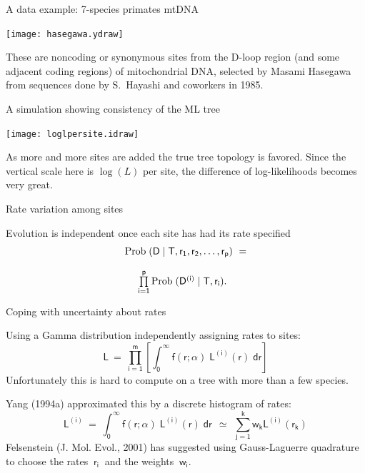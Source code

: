 \documentclass[bluish,slideColor,colorBG,pdf]{prosper}
\def\Prob{{\rm Prob\;}}
\begin{document}
\begin{slide}[Replace]{A data example: 7-species primates mtDNA}
\medskip

\centerline{\texttt{[image: hasegawa.ydraw]}}
\bigskip

These are noncoding or synonymous sites from the D-loop region (and some
adjacent coding regions) of mitochondrial DNA, selected by Masami Hasegawa from
sequences done by S.\ Hayashi and coworkers in 1985.


\end{slide}

\begin{slide}[Replace]{A simulation showing consistency of the ML tree}
\bigskip

\centerline{\texttt{[image: loglpersite.idraw]}}
\medskip

As more and more sites are added the true tree topology is favored.  Since
the vertical scale here is $\log(L)$ per site, the difference of log-likelihoods
becomes very great.

\end{slide}

\begin{slide}[Replace]{Rate variation among sites}
\medskip

Evolution is independent once each site has had its rate specified
\[
\begin{array}{l}
\mathsf{\Prob(D\; |\; T, r_1, r_2, \dots, r_p)\ = }\\
\\
\mathsf{~~~~\prod\limits_{i=1}^p \Prob(D^{(i)}\; |\; T, r_i)}.
\end{array}
\]

\end{slide}

\begin{slide}[Replace]{Coping with uncertainty about rates}
\medskip

Using a Gamma distribution independently assigning rates to sites:
\[
\mathsf{L\ =\ \prod_{i=1}^m \left[ \int_0^\infty f(r ; \alpha)\; L^{(i)}(r)\; dr \right]}
\]
Unfortunately this is hard to compute on a tree with more than a few species.

Yang (1994a) approximated this by a discrete histogram of rates:
\[
\mathsf{L^{(i)} \ =\ \int_0^\infty f(r ; \alpha)\; L^{(i)}(r)\; dr
\ \ \simeq\  \ \sum\limits_{j=1}^k w_k L^{(i)}(r_k)}
\]
Felsenstein (J. Mol. Evol., 2001) has suggested using Gauss-Laguerre quadrature to choose
the rates $~\mathsf{r_i}~$ and the weights $~\mathsf{w_i}$.

\end{slide}
\end{document}
